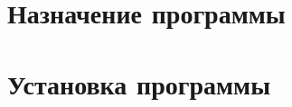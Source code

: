 \documentclass[12pt]{article}[a4paper,14pt,russian]
\begin{document}
\section{Назначение программы}
\section{Установка программы}
\end{document}
